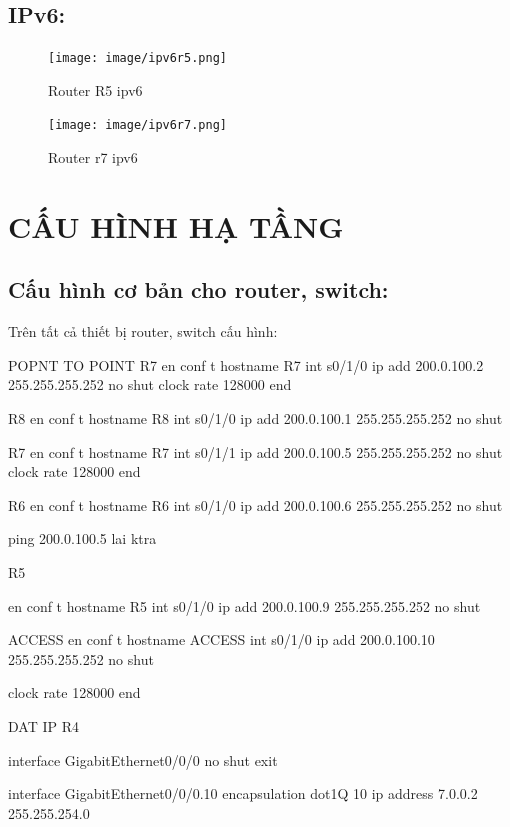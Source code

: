 \documentclass[13pt]{article}
\begin{document}
 \subsection{IPv6:}

\begin{figure}[h!]
                \centering
                \texttt{[image: image/ipv6r5.png]}
                \caption{Router R5 ipv6}
                \label{fig:label1}
            \end{figure}

\begin{figure}[h!]
                \centering
                \texttt{[image: image/ipv6r7.png]}
                \caption{Router r7 ipv6}
                \label{fig:label1}
            \end{figure}



\newpage
\newpage
\section{CẤU HÌNH HẠ TẦNG}
\subsection{Cấu hình cơ bản cho router, switch:} 
Trên tất cả thiết bị router, switch cấu hình:

    POPNT TO POINT
R7
en
conf t
hostname R7
int s0/1/0
ip add 200.0.100.2 255.255.255.252
no shut
clock rate 128000
end


R8
en
conf t
hostname R8
int s0/1/0
ip add 200.0.100.1 255.255.255.252
no shut

R7
en
conf t
hostname R7
int s0/1/1
ip add 200.0.100.5 255.255.255.252
no shut
clock rate 128000
end



R6
en
conf t
hostname R6
int s0/1/0
ip add 200.0.100.6 255.255.255.252
no shut

ping 200.0.100.5 lai ktra


R5

en
conf t
hostname R5
int s0/1/0
ip add 200.0.100.9 255.255.255.252
no shut

ACCESS
en
conf t
hostname ACCESS
int s0/1/0
ip add 200.0.100.10 255.255.255.252
no shut

clock rate 128000
end



DAT IP
R4

interface GigabitEthernet0/0/0
no shut 
exit

 interface GigabitEthernet0/0/0.10
 encapsulation dot1Q 10
 ip address 7.0.0.2 255.255.254.0
\end{document}
